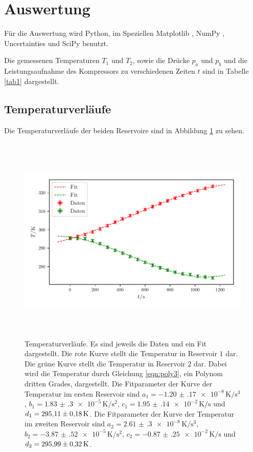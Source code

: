 \section{Auswertung}
\label{sec:Auswertung}
Für die Auswertung wird Python, im Speziellen Matplotlib \cite{matplotlib}, NumPy \cite{numpy}, Uncertainties \cite{uncertainties}
und SciPy \cite{scipy} benutzt.

\noindent Die gemessenen Temperaturen $T_1$ und $T_2$, sowie die Drücke
$p_a$ und $p_b$ und die Leistungsaufnahme des Kompressors
zu verschiedenen Zeiten $t$ sind in Tabelle \ref{tab1}
dargestellt.


\subsection{Temperaturverläufe}
Die Temperaturverläufe der beiden Reservoire sind in Abbildung
\ref{fig:plot1} zu sehen.

\begin{figure} %
    \centering
    \includegraphics[width=14cm, height=10cm]{build/plot1.pdf}
    \caption{Temperaturverläufe. Es sind jeweils die Daten und ein Fit dargestellt.
    Die rote Kurve stellt die Temperatur in Reservoir $\num{1}$ dar. Die grüne Kurve stellt 
    die Temperatur in Reservoir $\num{2}$ dar. Dabei wird die Temperatur
    durch Gleichung \ref{eqn:poly3}, ein Polynom dritten Grades, dargestellt. 
    Die Fitparameter der Kurve der Temperatur im ersten Reservoir sind $a_1=\num{-1.20(17)e-8} \, \si{\kelvin\per\cubic\second}$,
    $b_1=\num{1.83(30)e-5}\, \si{\kelvin\per\square\second}$, $c_1=\num{1.95(14)e-2} \, \si{\kelvin\per\second}$ und $d_1=\num{295.11 \pm 0.18} \, \si{\kelvin}$.
    Die Fitparameter der Kurve der Temperatur im zweiten Reservoir sind $a_2=\num{2.61(30)e-8} \, \si{\kelvin\per\cubic\second}$,
$b_2=\num{-3.87(52)e-5} \, \si{\kelvin\per\square\second}$, $c_2=\num{-0.87(25)e-2} \, \si{\kelvin\per\second}$ und $d_2=\num{295.99 \pm 0.32} \, \si{\kelvin}$.} %

    \label{fig:plot1}
\end{figure}

